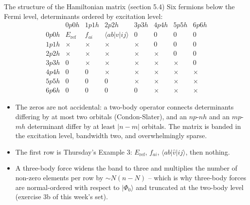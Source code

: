 \documentclass[aspectratio=169,10pt]{beamer}
\newcommand{\ket}[1]{\vert #1\rangle}
\newcommand{\element}[3]{\langle #1\vert #2\vert #3\rangle}
\begin{document}
\begin{frame}{The structure of the Hamiltonian matrix (section 5.4)}
  \small
  Six fermions below the Fermi level, determinants ordered by excitation level:
  \[
    \begin{array}{c|ccccccc}
       & 0p0h & 1p1h & 2p2h & 3p3h & 4p4h & 5p5h & 6p6h\\
      \hline
      0p0h & E_{\mathrm{ref}} & f_{ai} & \element{ab}{v}{ij} & 0 & 0 & 0 & 0\\
      1p1h & \times & \times & \times & \times & 0 & 0 & 0\\
      2p2h & \times & \times & \times & \times & \times & 0 & 0\\
      3p3h & 0 & \times & \times & \times & \times & \times & 0\\
      4p4h & 0 & 0 & \times & \times & \times & \times & \times\\
      5p5h & 0 & 0 & 0 & \times & \times & \times & \times\\
      6p6h & 0 & 0 & 0 & 0 & \times & \times & \times
    \end{array}
  \]
  \begin{itemize}
    \item The zeros are not accidental: a two-body operator connects determinants differing by at most two orbitals (Condon-Slater), and an $np$-$nh$ and an $mp$-$mh$ determinant differ by at least $|n-m|$ orbitals. The matrix is \alert{banded in the excitation level, bandwidth two}, and overwhelmingly sparse.
    \item The first row is Thursday's Example 3: $E_{\mathrm{ref}}$, $f_{ai}$, $\element{ab}{\hat{v}}{ij}$, then nothing.
    \item A three-body force widens the band to three and multiplies the number of non-zero elements per row by $\sim N(n-N)$ -- which is why three-body forces are normal-ordered with respect to $\ket{\Phi_0}$ and truncated at the two-body level (exercise 3b of this week's set).
  \end{itemize}
\end{frame}
\end{document}
